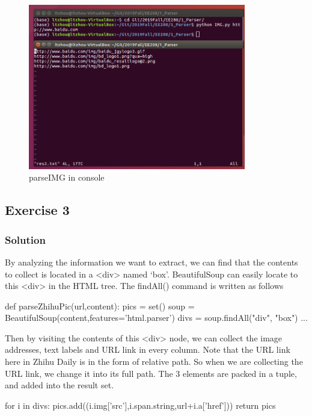 \documentclass{article}
\begin{document}
\begin{figure}[htbp]
\centering
\includegraphics[width=9.5cm]{img/test2_2.png}
\caption{parseIMG in console}
\label{img:2.2}
\end{figure}



\subsection{Exercise 3}

\subsubsection{Solution}

By analyzing the information we want to extract, we can find that the contents to collect is located in a <div> named `box'. BeautifulSoup can easily locate to this <div> in the HTML tree. The findAll() command is written as follows

\begin{python}
def parseZhihuPic(url,content):
    pics = set()
    soup = BeautifulSoup(content,features='html.parser')
    divs = soup.findAll("div", "box")
    ...
\end{python}

Then by visiting the contents of this <div> node, we can collect the image addresses, text labels and URL link in every column. Note that the URL link here in Zhihu Daily is in the form of relative path. So when we are collecting the URL link, we change it into its full path. The 3 elements are packed in a tuple, and added into the result set.
\begin{python}
    for i in divs:
        pics.add((i.img['src'],i.span.string,url+i.a['href']))
    return pics
\end{python} 
\end{document}
